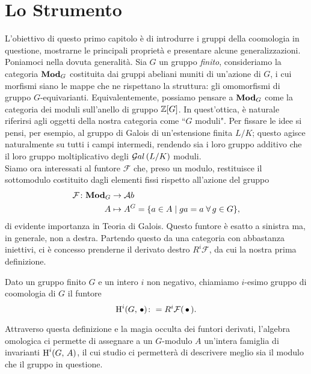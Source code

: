 \chapter{Lo Strumento}
\small

L'obiettivo di questo primo capitolo è di introdurre i gruppi della coomologia in questione, mostrarne le principali proprietà e presentare alcune generalizzazioni.\\

Poniamoci nella dovuta generalità. Sia $ G $ un gruppo \emph{finito}, consideriamo la categoria $ \mathbf{Mod}_G $ costituita dai gruppi abeliani muniti di un'azione di $ G $, i cui morfismi siano le mappe che ne rispettano la struttura: gli omomorfismi di gruppo $ G $-equivarianti. Equivalentemente, possiamo pensare a $ \mathbf{Mod}_G $ come la categoria dei moduli sull'anello di gruppo $ \mathbb{Z}[G] $. In quest'ottica, è naturale riferirsi agli oggetti della nostra categoria come \textquotedblleft$ G $ moduli".
Per fissare le idee si pensi, per esempio, al gruppo di Galois di un'estensione finita $ L/K $; questo agisce naturalmente su tutti i campi intermedi, rendendo sia i loro gruppo additivo che il loro gruppo moltiplicativo degli $ \mathcal{G}al\left( L/K \right) $ moduli. \\

Siamo ora interessati al funtore $ \mathcal{F} $ che, preso un modulo, restituisce il sottomodulo costituito dagli elementi fissi rispetto  all'azione del gruppo
\begin{align*} 
\mathcal{F} \colon \mathbf{Mod}_G &\to \mathcal{A}b \\
A &\mapsto A^G = \{ a \in A \mid ga = a \; \forall \, g \in G \},
\end{align*}
di evidente importanza in Teoria di Galois. Questo funtore è esatto a sinistra ma, in generale, non a destra. Partendo questo da una categoria con abbastanza iniettivi, ci è concesso prenderne il derivato destro $ R^i\mathcal{F} $, da cui la nostra prima definizione.

\begin{definition}
	Dato un gruppo finito $ G $ e un intero $ i $ non negativo, chiamiamo $ i $-esimo gruppo di coomologia di $ G $ il funtore
	\[ \operatorname{H}^i(G, \, \bullet) \colon = R^i\mathcal{F}(\,\bullet\,). \]
\end{definition}

Attraverso questa definizione e la magia occulta dei funtori derivati, l'algebra omologica ci permette di assegnare a un $ G $-modulo $ A $ un'intera famiglia di invarianti $ \operatorname{H}^i(G, \, A) $, il cui studio ci permetterà di descrivere meglio sia il modulo che il gruppo in questione. 

